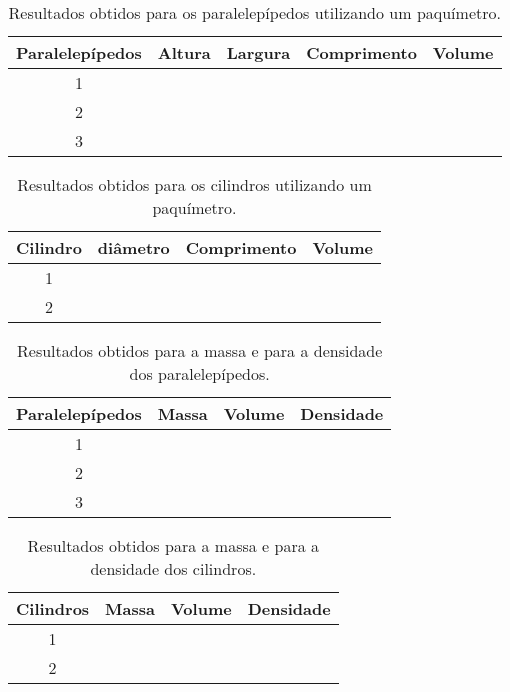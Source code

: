\begin{table*}[!htpb]
	\caption{Resultados obtidos para os paralelepípedos utilizando um paquímetro.}
	\label{TabelaDadosPaquimetro}
	\begin{tabular}{ccccc}
		\toprule
		{\centering Paralelepípedos} 				& Altura & Largura & Comprimento & Volume  \\
		\midrule
		\rowcolor[gray]{0.9} 1 & \phantom{xxxxxxxxxxxxxxx} & \phantom{xxxxxxxxxxxxxxx} & \phantom{xxxxxxxxxxxxxxx} & \phantom{xxxxxxxxxxxxxxx} \\
		2 &  &  & & \\
		\rowcolor[gray]{0.9} 3 &  &  & & \\
		\bottomrule
	\end{tabular}
\end{table*}

\begin{table*}[!htpb]
	\caption{Resultados obtidos para os cilindros utilizando um paquímetro.}
	\label{TabelaDadosPaquimetroCil}
	\begin{tabular}{cccc}
		\toprule
		{\centering Cilindro} 				& diâmetro & Comprimento & Volume  \\
		\midrule
		\rowcolor[gray]{0.9} 1 & \phantom{xxxxxxxxxxxxxxx} & \phantom{xxxxxxxxxxxxxxx} & \phantom{xxxxxxxxxxxxxxx} \\
		2 &  &  & \\
		\bottomrule
	\end{tabular}
\end{table*}

\begin{table*}[!htpb]
	\caption{Resultados obtidos para a massa e para a densidade dos paralelepípedos.}
	\label{TabelaDadosMassa}
	\begin{tabular}{cccc}
		\toprule
		{\centering Paralelepípedos} 				& Massa & Volume & Densidade \\
		\midrule
		\rowcolor[gray]{0.9} 1 & \phantom{xxxxxxxxxxxxxxx} & \phantom{xxxxxxxxxxxxxxx} & \phantom{xxxxxxxxxxxxxxx} \\
		2 &  &  &  \\
		\rowcolor[gray]{0.9} 3 &  &  &  \\
		\bottomrule
	\end{tabular}
\end{table*}

\begin{table*}[!htpb]
	\caption{Resultados obtidos para a massa e para a densidade dos cilindros.}
	\label{TabelaDadosMassaCil}
	\begin{tabular}{cccc}
		\toprule
		{\centering Cilindros} 				& Massa & Volume & Densidade \\
		\midrule
		\rowcolor[gray]{0.9} 1 & \phantom{xxxxxxxxxxxxxxx} & \phantom{xxxxxxxxxxxxxxx} & \phantom{xxxxxxxxxxxxxxx} \\
		2 &  &  &  \\
		\bottomrule
	\end{tabular}
\end{table*}
